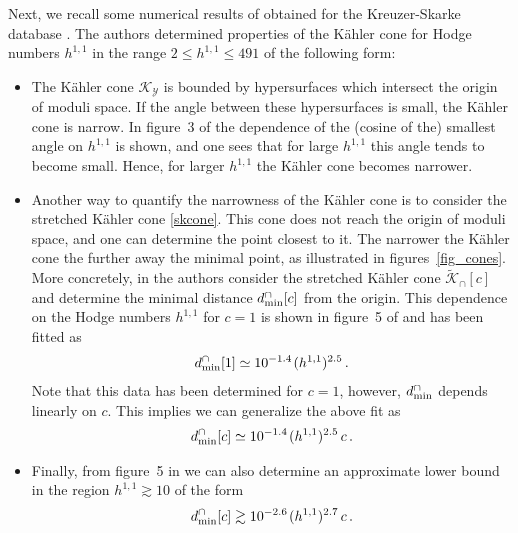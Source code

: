 \documentclass[12pt,a4paper]{article}
\newcommand{\eq}[1]{\begin{equation}
                     \begin{split} #1 \end{split}
                     \end{equation}}
\newcommand{\op}{\hspace{1pt}}
\numberwithin{equation}{section}
\begin{document}
Next, we recall some numerical results of \cite{Demirtas:2018akl}
obtained for the Kreuzer-Skarke database  \cite{Kreuzer:2000xy}. 
The authors
determined properties of the K\"ahler cone for Hodge numbers $h^{1,1}$ 
in the range $2\leq h^{1,1}\leq491$ of the following form:
\begin{itemize}

\item  The K\"ahler cone $\mathcal K_{\mathcal Y}$ 
is bounded by hypersurfaces which intersect
the origin of moduli space. If the angle between these
hypersurfaces is small, the K\"ahler cone is narrow. 
In figure~3 of \cite{Demirtas:2018akl} the dependence of the (cosine of 
the) smallest angle on $h^{1,1}$ is shown, and one sees that for large $h^{1,1}$ 
this angle tends to become small. Hence, for larger $h^{1,1}$
the K\"ahler cone becomes narrower. 


\item Another way to quantify the narrowness of the K\"ahler cone 
is to consider the stretched K\"ahler cone \eqref{skcone}.
This cone does not reach the origin of moduli space, and
one can determine the point closest to it. 
The narrower the K\"ahler cone the further away 
the minimal point, as illustrated in figures~\ref{fig_cones}.
More concretely, in \cite{Demirtas:2018akl}
the authors consider the stretched K\"ahler cone 
$\widetilde{\mathcal K}_{\cap}[c ]$ and 
determine 
the minimal distance 
$d^{\cap}_{\rm min}[c]$ from the origin.
This dependence on the Hodge numbers $h^{1,1}$ for $c=1$ 
is shown in 
figure~5 of \cite{Demirtas:2018akl}
and has been fitted as
\eq{
  d^{\cap}_{\rm min}[1] \simeq 10^{-1.4} \op (h^{1,1})^{2.5}  \,.
}
Note that this data has been determined for $c=1$, 
however, $d^{\cap}_{\rm min}$ depends linearly on $c$.
This implies we can generalize the above fit as
\eq{
  \label{cone_fit_01}
 d^{\cap}_{\rm min}[c] \simeq 10^{-1.4} \op (h^{1,1})^{2.5} \, c\,.
}


\item Finally, from  figure~5 in \cite{Demirtas:2018akl} we can also determine an approximate lower bound
in the region $h^{1,1}\gtrsim 10$ of the form 
\eq{
d^{\cap}_{\rm min}[c] \gtrsim 10^{-2.6} \op (h^{1,1})^{2.7}\, c  \,.
}



\end{itemize}



\end{document}
